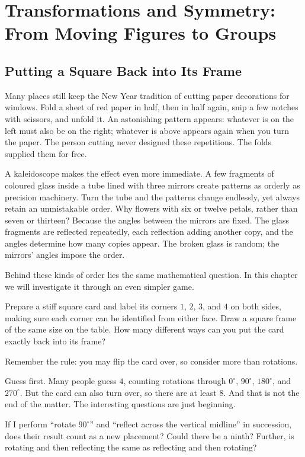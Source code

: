 \chapter{Transformations and Symmetry: From Moving Figures to Groups}

\section{Putting a Square Back into Its Frame}

Many places still keep the New Year tradition of cutting paper decorations for windows. Fold a sheet of red paper in half, then in half again, snip a few notches with scissors, and unfold it. An astonishing pattern appears: whatever is on the left must also be on the right; whatever is above appears again when you turn the paper. The person cutting never designed these repetitions. The folds supplied them for free.

A kaleidoscope makes the effect even more immediate. A few fragments of coloured glass inside a tube lined with three mirrors create patterns as orderly as precision machinery. Turn the tube and the patterns change endlessly, yet always retain an unmistakable order. Why flowers with six or twelve petals, rather than seven or thirteen? Because the angles between the mirrors are fixed. The glass fragments are reflected repeatedly, each reflection adding another copy, and the angles determine how many copies appear. The broken glass is random; the mirrors' angles impose the order.

Behind these kinds of order lies the same mathematical question. In this chapter we will investigate it through an even simpler game.

Prepare a stiff square card and label its corners $1$, $2$, $3$, and $4$ on both sides, making sure each corner can be identified from either face. Draw a square frame of the same size on the table. How many different ways can you put the card exactly back into its frame?

Remember the rule: you may flip the card over, so consider more than rotations.

Guess first. Many people guess $4$, counting rotations through $0^\circ$, $90^\circ$, $180^\circ$, and $270^\circ$. But the card can also turn over, so there are at least $8$. And that is not the end of the matter. The interesting questions are just beginning.

If I perform ``rotate $90^\circ$'' and ``reflect across the vertical midline'' in succession, does their result count as a new placement? Could there be a ninth? Further, is rotating and then reflecting the same as reflecting and then rotating?

